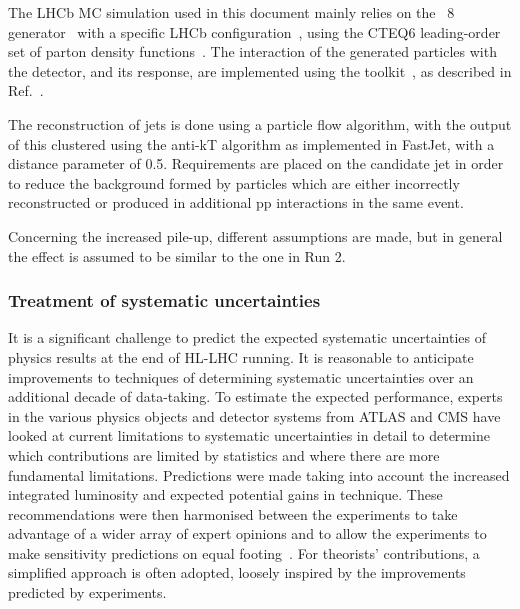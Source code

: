 The LHCb MC simulation used in this document mainly relies on the \pythia~8 generator~\cite{Sjostrand:2007gs} with a specific LHCb configuration~\cite{LHCb-PROC-2010-056}, using the CTEQ6 leading-order set of parton density functions~\cite{cteq6}. The interaction of the generated particles with the detector, and its response, are implemented using the \geant{} toolkit~\cite{Allison:2006ve,Agostinelli:2002hh}, as described in Ref.~\cite{LHCb-PROC-2011-006}. 

The reconstruction of jets is done using a particle flow algorithm, with the output of this clustered using
the anti-kT algorithm as implemented in FastJet, with a distance parameter of
0.5. Requirements are placed on the candidate jet in order to reduce the background
formed by particles which are either incorrectly reconstructed or produced in additional pp interactions in the same event.

Concerning the increased pile-up, different assumptions are made, but in general the effect is assumed to be similar to the one in Run 2.


\subsubsection{Treatment of systematic uncertainties}
\label{sec:methods:syst}
It is a significant challenge to predict the expected systematic uncertainties of physics results at the end of HL-LHC running.
It is reasonable to anticipate improvements to techniques of determining systematic uncertainties over an additional decade of data-taking.
To estimate the expected performance, experts in the various physics objects and detector systems from ATLAS and CMS have looked at current limitations to
systematic uncertainties in detail to determine which contributions are limited by statistics and where there are more fundamental limitations.
Predictions were made taking into account the increased integrated luminosity and expected potential gains in technique.
These recommendations were then harmonised between the experiments to take advantage of a wider array of expert opinions and to allow the experiments to make sensitivity predictions on equal footing~\cite{ATLAS_PERF_Note,Collaboration:2650976}. For theorists' contributions, a simplified approach is often adopted, loosely inspired by the improvements predicted by experiments. 

